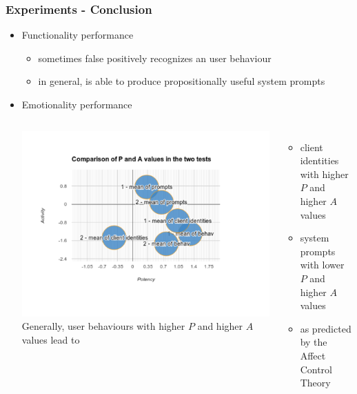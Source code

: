 \documentclass{beamer}
\begin{document}
\begin{frame}
\frametitle{Experiments - Conclusion}
\begin{itemize}
\item Functionality performance
\begin{itemize}
\item sometimes false positively recognizes an user behaviour
\item in general, is able to produce propositionally useful system prompts
\end{itemize}
\item Emotionality performance
\begin{columns}[c]
\includegraphics[trim=10mm 35mm 25mm 10mm, clip, width=\linewidth]{fig/fig-compare-two-tests.pdf}
Generally, user behaviours with higher $P$ and higher $A$ values lead to
\begin{itemize}
\item client identities with higher $P$ and higher $A$ values
\item system prompts with lower $P$ and higher $A$ values
\item as predicted by the Affect Control Theory
\end{itemize}
\end{columns}
\end{itemize}
\end{frame}
\end{document}
